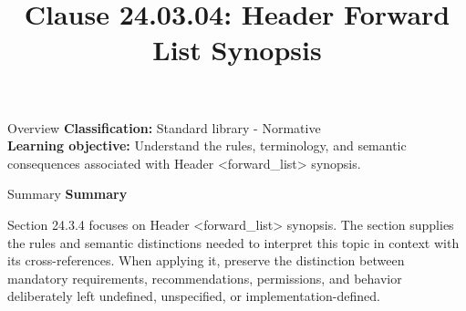 \documentclass[10pt,letterpaper]{article}
\title{Clause 24.03.04: Header Forward List Synopsis}
\author{}
\date{}
\begin{document}
\maketitle
\begin{CornellOverviewBox}{Overview}
\textbf{Classification:} Standard library - Normative\\[2pt]
\textbf{Learning objective:} Understand the rules, terminology, and semantic consequences associated with Header <forward\_list> synopsis.
\end{CornellOverviewBox}\begin{CornellSummaryBox}{Summary}
{\sffamily\bfseries\color{Accent} Summary}\par\vspace{3pt}Section 24.3.4 focuses on Header <forward\_list> synopsis. The section supplies the rules and semantic distinctions needed to interpret this topic in context with its cross-references. When applying it, preserve the distinction between mandatory requirements, recommendations, permissions, and behavior deliberately left undefined, unspecified, or implementation-defined.
\end{CornellSummaryBox}
\end{document}
